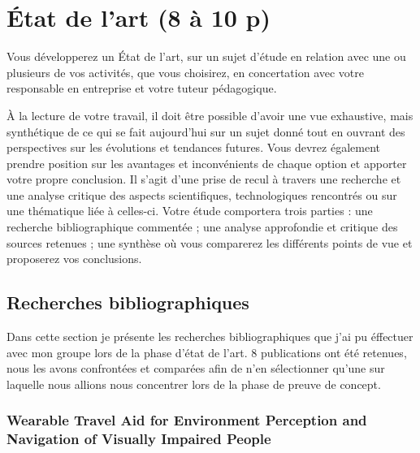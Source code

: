 \documentclass[11pt]{article}
\begin{document}
  \section{État de l'art (8 à 10 p)}  
  
  Vous développerez un État de l’art, sur un sujet d’étude en relation avec une ou plusieurs de vos
  activités, que vous choisirez, en concertation avec votre responsable en entreprise et votre tuteur
  pédagogique.   
  
  À la lecture de votre travail, il doit être possible d’avoir une vue exhaustive, mais
  synthétique de ce qui se fait aujourd’hui sur un sujet donné tout en ouvrant des perspectives sur les
  évolutions et tendances futures. Vous devrez également prendre position sur les avantages et
  inconvénients de chaque option et apporter votre propre conclusion.
  Il s’agit d’une prise de recul à travers une recherche et une analyse critique des aspects scientifiques,
  technologiques rencontrés ou sur une thématique liée à celles-ci. Votre étude comportera trois parties
  : une recherche bibliographique commentée ; une analyse approfondie et critique des sources
  retenues ; une synthèse où vous comparerez les différents points de vue et proposerez vos
  conclusions.
  \subsection{Recherches bibliographiques}
  
  Dans cette section je présente les recherches bibliographiques que j'ai pu éffectuer avec mon groupe lors de la phase d'état de l'art.
  8 publications ont été retenues, nous les avons confrontées et comparées afin de n'en sélectionner qu'une sur laquelle nous allions nous 
  concentrer lors de la phase de preuve de concept. 

  \subsubsection{Wearable Travel Aid for Environment Perception and Navigation of
  Visually Impaired People}
\end{document}
